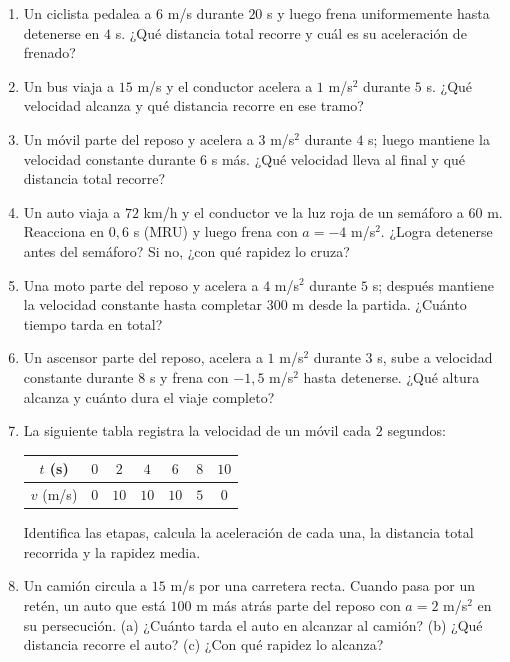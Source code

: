 \documentclass[12pt, letterpaper]{article}
\begin{document}
\begin{enumerate}[leftmargin=*, resume]
  \item \facil{} Un ciclista pedalea a $6$ m/s durante $20$ s y luego frena uniformemente hasta detenerse en $4$ s. ¿Qué distancia total recorre y cuál es su aceleración de frenado?

  \item \facil{} Un bus viaja a $15$ m/s y el conductor acelera a $1$ m/s$^2$ durante $5$ s. ¿Qué velocidad alcanza y qué distancia recorre en ese tramo?

  \item \facil{} Un móvil parte del reposo y acelera a $3$ m/s$^2$ durante $4$ s; luego mantiene la velocidad constante durante $6$ s más. ¿Qué velocidad lleva al final y qué distancia total recorre?

  \item \medio{} Un auto viaja a $72$ km/h y el conductor ve la luz roja de un semáforo a $60$ m. Reacciona en $0{,}6$ s (MRU) y luego frena con $a = -4$ m/s$^2$. ¿Logra detenerse antes del semáforo? Si no, ¿con qué rapidez lo cruza?

  \item \medio{} Una moto parte del reposo y acelera a $4$ m/s$^2$ durante $5$ s; después mantiene la velocidad constante hasta completar $300$ m desde la partida. ¿Cuánto tiempo tarda en total?

  \item \medio{} Un ascensor parte del reposo, acelera a $1$ m/s$^2$ durante $3$ s, sube a velocidad constante durante $8$ s y frena con $-1{,}5$ m/s$^2$ hasta detenerse. ¿Qué altura alcanza y cuánto dura el viaje completo?

  \item \medio{} La siguiente tabla registra la velocidad de un móvil cada $2$ segundos:
  \begin{center}
    \small
    \begin{tabular}{@{}c c c c c c c@{}}
      \toprule
      $t$ (s) & $0$ & $2$ & $4$ & $6$ & $8$ & $10$ \\
      \midrule
      $v$ (m/s) & $0$ & $10$ & $10$ & $10$ & $5$ & $0$ \\
      \bottomrule
    \end{tabular}
  \end{center}
  Identifica las etapas, calcula la aceleración de cada una, la distancia total recorrida y la rapidez media.

  \item \dificil{} Un camión circula a $15$ m/s por una carretera recta. Cuando pasa por un retén, un auto que está $100$ m más atrás parte del reposo con $a = 2$ m/s$^2$ en su persecución. (a) ¿Cuánto tarda el auto en alcanzar al camión? (b) ¿Qué distancia recorre el auto? (c) ¿Con qué rapidez lo alcanza?


\end{enumerate}
\end{document}
